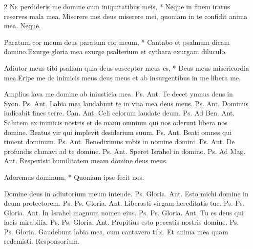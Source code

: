 \begin{multicols*}{2}
\lettrine[lines=2]{\zallmancaps \color{Red} N}{e} \hypertarget{ne-perdideris}{\label{ne-perdideris}} perdideris me domine cum iniquitatibus meis, * Neque in finem iratus reserves mala mea. \V Miserere mei deus miserere mei, quoniam in te confidit anima mea. Neque.
\begin{responsory}
{Paratum cor meum deus paratum cor meum, * Cantabo et psalmum dicam domino.}{Exurge gloria mea exurge psalterium et cythara exurgam diluculo.}
\end{responsory}%
\begin{responsory-doxology}
{Adiutor meus tibi psallam quia deus susceptor meus es, * Deus meus misericordia mea.}{Eripe me de inimicis meus deus meus et ab insurgentibus in me libera me.}
\end{responsory-doxology}%
 Amplius lava me domine ab iniusticia mea. {\color{Red} Ps.}  {\color{Red} Ant.} Te decet ymnus deus in Syon. {\color{Red} Ps.}  {\color{Red} Ant.} Labia mea laudabunt te in vita mea deus meus. {\color{Red} Ps.}  {\color{Red} Ant.} Dominus iudicabit fines terre. {\color{Red} Can.}  {\color{Red} Ant.} Celi celorum laudate deum. {\color{Red} Ps.}  {\color{Red} Ad Ben. Ant.} Salutem ex inimicis nostris et de manu omnium qui nos oderunt libera nos domine.
 Beatus vir qui implevit desiderium suum. {\color{Red} Ps.}  {\color{Red} Ant.} Beati omnes qui timent dominum. {\color{Red} Ps.}  {\color{Red} Ant.} Benediximus vobis in nomine domini. {\color{Red} Ps.}  {\color{Red} Ant.} De profundis clamavi ad te domine. {\color{Red} Ps.}  {\color{Red} Ant.} Speret Israhel in domino. {\color{Red} Ps.}  {\color{Red} Ad Mag. Ant.} Respexisti humilitatem meam domine deus meus.
{\color{Red} }
\par {}
\begin{invitatory}
{Adoremus dominum, * Quoniam ipse fecit nos.}
\end{invitatory}
 Domine deus in adiutorium meum intende. {\color{Red} Ps.}
  Gloria. {\color{Red} Ant.} Esto michi domine in deum protectorem. {\color{Red} Ps.}  {\color{Red} Ps.}  Gloria. {\color{Red} Ant.} Liberasti virgam hereditatis tue. {\color{Red} Ps.}  {\color{Red} Ps.}  Gloria. {\color{Red} Ant.} In Israhel magnum nomen eius. {\color{Red} Ps.}  {\color{Red} Ps.}  Gloria. {\color{Red} Ant.} Tu es deus qui facis mirabilia. {\color{Red} Ps.}  {\color{Red} Ps.}  Gloria. {\color{Red} Ant.} Propitius esto peccatis nostris domine. {\color{Red} Ps.}  {\color{Red} Ps.}  Gloria. \V Gaudebunt labia mea, cum cantavero tibi. \R Et anima mea quam redemisti. {\color{Red} Responsorium.}

\end{multicols*}

